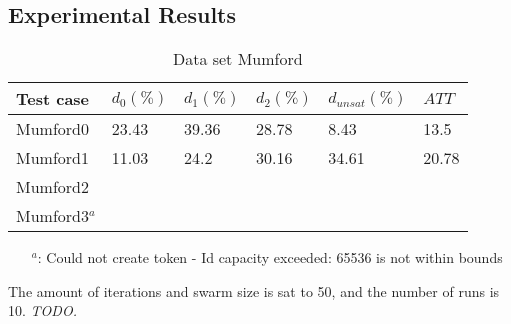 \subsection{Experimental Results}
\label{subsec:scalabilityExperiments_results}




\begin{table}[H]
    \centering
    \hspace*{-1.0cm}
    \begin{tabular}{|l|l|l|l|l|l|}
        \hline
        Test case &  $d_0(\%)$ & $d_1(\%)$ & $d_2(\%)$ & $d_{unsat}(\%)$ & $ATT$\\
        \hline
        Mumford0 & 23.43 & 39.36 & 28.78 & 8.43 & 13.5\\
        Mumford1 & 11.03 & 24.2 & 30.16 & 34.61 & 20.78\\
        Mumford2 & &  & & &\\
        Mumford3$^a$  & & & &&\\
        \hline
    \end{tabular}
    \caption{Data set Mumford}
    \begin{itemize}[noitemsep]
    \item[$^a$:] Could not create token - Id capacity exceeded: 65536 is not within bounds
    \end{itemize}
    \label{table:dataSet_mumford}
\end{table}
The amount of iterations and swarm size is sat to 50, and the number of runs is 10. \emph{\color{blue} TODO.}